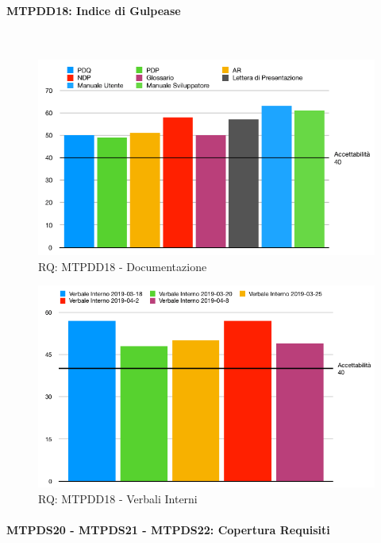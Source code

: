 \paragraph{MTPDD18: Indice di Gulpease}\-\\
\label{gulpiRQ}

\begin{figure}[H]
	\begin{center}
		\includegraphics[scale=0.6]{./images/grafici_RQ/gulpeaseDocumenti.png} 
	\end{center}
	\caption{RQ: MTPDD18 - Documentazione}
\end{figure}

\begin{figure}[H]
	\begin{center}
		\includegraphics[scale=0.5]{./images/grafici_RQ/gulpeaseVerbali.png} 
	\end{center}
	\caption{RQ: MTPDD18 - Verbali Interni}
\end{figure}

\paragraph{MTPDS20 - MTPDS21 - MTPDS22: Copertura Requisiti}\-\\\label{copReq}


